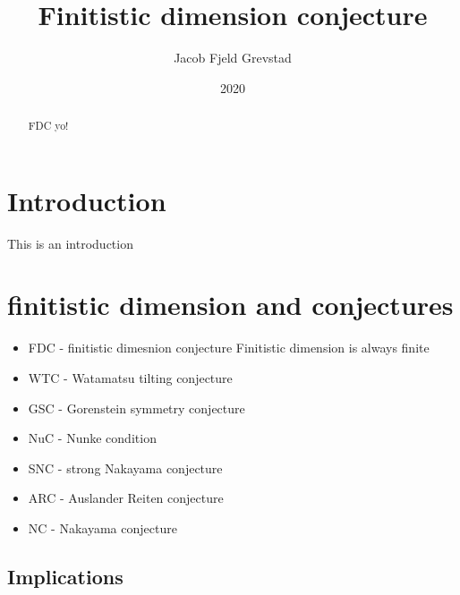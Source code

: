 \documentclass[11pt, a4paper, english]{article}
\theoremstyle{definition}
\begin{document}
\title{Finitistic dimension conjecture}
\author{Jacob Fjeld Grevstad}
\date{2020}
\maketitle
{}

\begin{abstract}
FDC yo!
\end{abstract}
\clearpage

\tableofcontents
\clearpage

\section*{Introduction}
%

This is an introduction

\section{finitistic dimension and conjectures}

\begin{itemize}
	\item FDC - finitistic dimesnion conjecture
	Finitistic dimension is always finite
	\item WTC - Watamatsu tilting conjecture
	
	\item GSC - Gorenstein symmetry conjecture
	\item NuC - Nunke condition
	\item SNC - strong Nakayama conjecture
	\item ARC - Auslander Reiten conjecture
	\item NC - Nakayama conjecture
\end{itemize}

\subsection{Implications}
\end{document}
